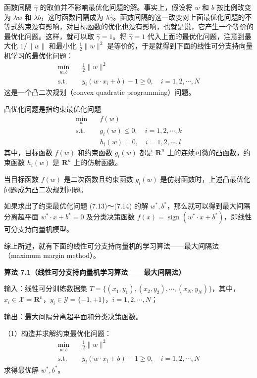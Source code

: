 \documentclass[UTF8, 12pt, fontset=fandol, oneside]{ctexart}
\begin{document}
函数间隔 $\hat{\gamma}$ 的取值并不影响最优化问题的解。事实上，假设将 $w$ 和 $b$ 按比例改变为 $\lambda w$ 和 $\lambda b$，这时函数间隔成为 $\lambda\hat{\gamma}$。函数间隔的这一改变对上面最优化问题的不等式约束没有影响，对目标函数的优化也没有影响，也就是说，它产生一个等价的最优化问题。这样，就可以取 $\hat{\gamma}=1$。将 $\hat{\gamma}=1$ 代入上面的最优化问题，注意到最大化 $1/\|w\|$ 和最小化 $\frac{1}{2}\|w\|^2$ 是等价的，于是就得到下面的线性可分支持向量机学习的最优化问题：
\begin{equation}
\begin{aligned}
\min_{w,b}\quad & \frac{1}{2}\|w\|^2\\
\mathrm{s.t.}\quad & y_i(w\cdot x_i+b)-1\geq 0,\quad i=1,2,\cdots,N
\end{aligned}
\tag{7.13--7.14}
\end{equation}
这是一个凸二次规划（convex quadratic programming）问题。

凸优化问题是指约束最优化问题
\begin{equation}
\begin{aligned}
\min_w\quad & f(w)\\
\mathrm{s.t.}\quad & g_i(w)\leq 0,\quad i=1,2,\cdots,k\\
& h_i(w)=0,\quad i=1,2,\cdots,l
\end{aligned}
\tag{7.15--7.17}
\end{equation}
其中，目标函数 $f(w)$ 和约束函数 $g_i(w)$ 都是 $\mathbf{R}^n$ 上的连续可微的凸函数，约束函数 $h_i(w)$ 是 $\mathbf{R}^n$ 上的仿射函数。

当目标函数 $f(w)$ 是二次函数且约束函数 $g_i(w)$ 是仿射函数时，上述凸最优化问题成为凸二次规划问题。

如果求出了约束最优化问题 (7.13)～(7.14) 的解 $w^*,b^*$，那么就可以得到最大间隔分离超平面 $w^*\cdot x+b^*=0$ 及分类决策函数 $f(x)=\operatorname{sign}(w^*\cdot x+b^*)$，即线性可分支持向量机模型。

综上所述，就有下面的线性可分支持向量机的学习算法——最大间隔法（maximum margin method）。

\noindent\textbf{算法 7.1（线性可分支持向量机学习算法——最大间隔法）}

输入：线性可分训练数据集 $T=\{(x_1,y_1),(x_2,y_2),\cdots,(x_N,y_N)\}$，其中，$x_i\in\mathcal{X}=\mathbf{R}^n$，$y_i\in\mathcal{Y}=\{-1,+1\}$，$i=1,2,\cdots,N$；

输出：最大间隔分离超平面和分类决策函数。

（1）构造并求解约束最优化问题：
\[
\begin{aligned}
\min_{w,b}\quad & \frac{1}{2}\|w\|^2\\
\mathrm{s.t.}\quad & y_i(w\cdot x_i+b)-1\geq 0,\quad i=1,2,\cdots,N
\end{aligned}
\]
求得最优解 $w^*,b^*$。
\end{document}
